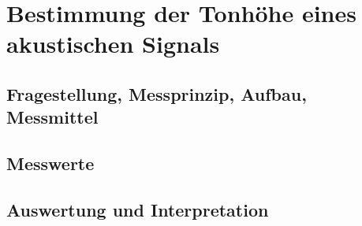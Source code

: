 %
%
\chapter{Bestimmung der Tonhöhe eines akustischen Signals}
\label{chap:VERSUCH_1}

 
\section{Fragestellung, Messprinzip, Aufbau, Messmittel}
\label{chap:VERSUCH_1_FRAGESTELLUNG}


\section{Messwerte}
\label{chap:VERSUCH_1_MESSWERTE}


\section{Auswertung und Interpretation}
\label{chap:VERSUCH_1_AUSWERTUNG}
